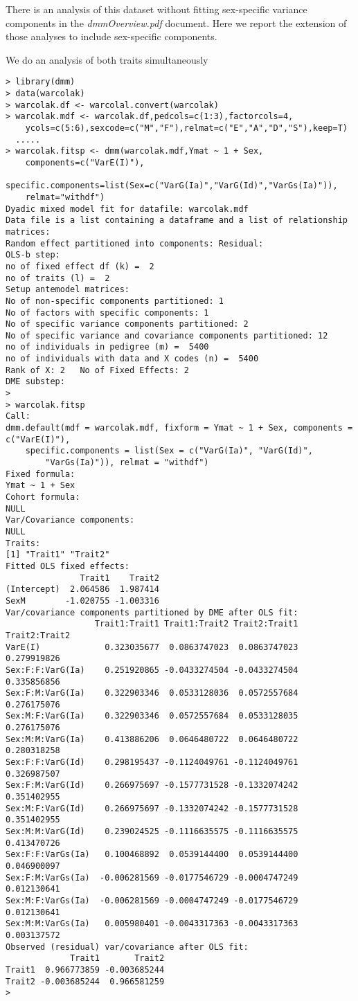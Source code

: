 \documentclass[titlepage]{article}  %
\begin{document}
There is an analysis of this dataset without fitting sex-specific variance components in the {\em dmmOverview.pdf} document. Here we report the extension of those analyses to include sex-specific components.

We do an analysis of both traits simultaneously
\begin{verbatim}
> library(dmm)
> data(warcolak)
> warcolak.df <- warcolal.convert(warcolak)
> warcolak.mdf <- warcolak.df,pedcols=c(1:3),factorcols=4,
    ycols=c(5:6),sexcode=c("M","F"),relmat=c("E","A","D","S"),keep=T)
  .....
> warcolak.fitsp <- dmm(warcolak.mdf,Ymat ~ 1 + Sex,
    components=c("VarE(I)"),
    specific.components=list(Sex=c("VarG(Ia)","VarG(Id)","VarGs(Ia)")),
    relmat="withdf")
Dyadic mixed model fit for datafile: warcolak.mdf  
Data file is a list containing a dataframe and a list of relationship matrices:
Random effect partitioned into components: Residual:
OLS-b step:
no of fixed effect df (k) =  2 
no of traits (l) =  2 
Setup antemodel matrices:
No of non-specific components partitioned: 1 
No of factors with specific components: 1 
No of specific variance components partitioned: 2 
No of specific variance and covariance components partitioned: 12 
no of individuals in pedigree (m) =  5400 
no of individuals with data and X codes (n) =  5400 
Rank of X: 2   No of Fixed Effects: 2 
DME substep:
>
> warcolak.fitsp
Call:
dmm.default(mdf = warcolak.mdf, fixform = Ymat ~ 1 + Sex, components = c("VarE(I)"), 
    specific.components = list(Sex = c("VarG(Ia)", "VarG(Id)", 
        "VarGs(Ia)")), relmat = "withdf")
Fixed formula:
Ymat ~ 1 + Sex
Cohort formula:
NULL
Var/Covariance components:
NULL
Traits:
[1] "Trait1" "Trait2"
Fitted OLS fixed effects:
               Trait1    Trait2
(Intercept)  2.064586  1.987414
SexM        -1.020755 -1.003316
Var/covariance components partitioned by DME after OLS fit:
                  Trait1:Trait1 Trait1:Trait2 Trait2:Trait1 Trait2:Trait2
VarE(I)             0.323035677  0.0863747023  0.0863747023   0.279919826
Sex:F:F:VarG(Ia)    0.251920865 -0.0433274504 -0.0433274504   0.335856856
Sex:F:M:VarG(Ia)    0.322903346  0.0533128036  0.0572557684   0.276175076
Sex:M:F:VarG(Ia)    0.322903346  0.0572557684  0.0533128035   0.276175076
Sex:M:M:VarG(Ia)    0.413886206  0.0646480722  0.0646480722   0.280318258
Sex:F:F:VarG(Id)    0.298195437 -0.1124049761 -0.1124049761   0.326987507
Sex:F:M:VarG(Id)    0.266975697 -0.1577731528 -0.1332074242   0.351402955
Sex:M:F:VarG(Id)    0.266975697 -0.1332074242 -0.1577731528   0.351402955
Sex:M:M:VarG(Id)    0.239024525 -0.1116635575 -0.1116635575   0.413470726
Sex:F:F:VarGs(Ia)   0.100468892  0.0539144400  0.0539144400   0.046900097
Sex:F:M:VarGs(Ia)  -0.006281569 -0.0177546729 -0.0004747249   0.012130641
Sex:M:F:VarGs(Ia)  -0.006281569 -0.0004747249 -0.0177546729   0.012130641
Sex:M:M:VarGs(Ia)   0.005980401 -0.0043317363 -0.0043317363   0.003137572
Observed (residual) var/covariance after OLS fit:
             Trait1       Trait2
Trait1  0.966773859 -0.003685244
Trait2 -0.003685244  0.966581259
> 
\end{verbatim}
\end{document}
